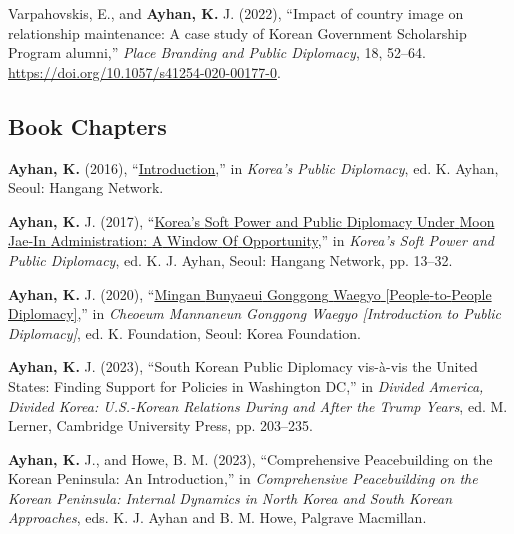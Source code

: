 \documentclass[11pt,a4paper,]{awesome-cv}
\begin{document}
\leavevmode{}%
Varpahovskis, E., and \textbf{Ayhan, K.} J. (2022), {``Impact of country
image on relationship maintenance: A case study of {Korean} {Government}
{Scholarship} {Program} alumni,''} \emph{Place Branding and Public
Diplomacy}, 18, 52--64.
\url{https://doi.org/10.1057/s41254-020-00177-0}.

\hypertarget{book-chapters}{%
\subsection{Book Chapters}\label{book-chapters}}

\hypertarget{refs_section}{}
\leavevmode{}%
\textbf{Ayhan, K.} (2016),
{``\href{https://www.researchgate.net/publication/318492917_Korea\textquotesingle{}s_Public_Diplomacy}{Introduction},''}
in \emph{Korea's {Public} {Diplomacy}}, ed. K. Ayhan, Seoul: Hangang
Network.

\leavevmode{}%
\textbf{Ayhan, K.} J. (2017),
{``\href{https://www.researchgate.net/publication/321874044_Korea\textquotesingle{}s_Soft_Power_and_Public_Diplomacy}{Korea's
{Soft} {Power} and {Public} {Diplomacy} {Under} {Moon} {Jae}-{In}
{Administration}: {A} {Window} {Of} {Opportunity}},''} in \emph{Korea's
{Soft} {Power} and {Public} {Diplomacy}}, ed. K. J. Ayhan, Seoul:
Hangang Network, pp. 13--32.

\leavevmode{}%
\textbf{Ayhan, K.} J. (2020),
{``\href{http://www.kf.or.kr/archives/ebook/ebook_view.do?p_cidx=3250\&p_cfidx=113206}{Mingan
{Bunyaeui} {Gonggong} {Waegyo} {[}{People}-to-{People}
{Diplomacy}{]}},''} in \emph{Cheoeum {Mannaneun} {Gonggong} {Waegyo}
{[}{Introduction} to {Public} {Diplomacy}{]}}, ed. K. Foundation, Seoul:
Korea Foundation.

\leavevmode{}%
\textbf{Ayhan, K.} J. (2023), {``South {Korean} {Public} {Diplomacy}
vis-à-vis the {United} {States}: {Finding} {Support} for {Policies} in
{Washington} {DC},''} in \emph{Divided {America}, {Divided} {Korea}:
{U}.{S}.-{Korean} {Relations} {During} and {After} the {Trump} {Years}},
ed. M. Lerner, Cambridge University Press, pp. 203--235.

\leavevmode{}%
\textbf{Ayhan, K.} J., and Howe, B. M. (2023), {``Comprehensive
{Peacebuilding} on the {Korean} {Peninsula}: {An} {Introduction},''} in
\emph{Comprehensive {Peacebuilding} on the {Korean} {Peninsula}:
{Internal} {Dynamics} in {North} {Korea} and {South} {Korean}
{Approaches}}, eds. K. J. Ayhan and B. M. Howe, Palgrave Macmillan.
\end{document}
